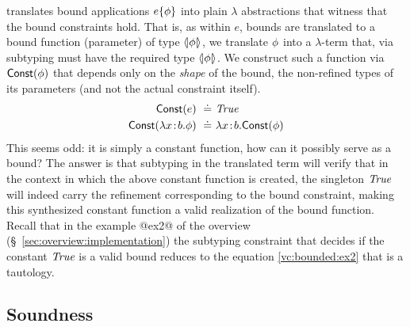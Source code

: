  translates bound applications
$ e \{ \phi \} $ into plain $\lambda$
abstractions that witness that the bound constraints
hold.
%
That is, as within $e$, bounds are translated to a bound
function (parameter) of type $\langle\!| \phi |\!\rangle$, we
translate $\phi$ into a $\lambda$-term that, via
subtyping must have the required type $\langle\!| \phi |\!\rangle$.
%
We construct such a function via $\mathsf{Const}(\phi)$
that depends only on the \emph{shape} of the bound,
\ie the non-refined types of its parameters (and not
the actual constraint itself).
\begin{align*}
\mathsf{Const}(e) \ \doteq\  & \textit{True} \\
\mathsf{Const}(\lambda {x\!:\!b}. \phi) \ \doteq\  &  \lambda {x\!:\!b}. \mathsf{Const}(\phi)
\end{align*}
%
This seems odd: it is simply a constant function, how
can it possibly serve as a bound? The answer is that
subtyping in the translated \corelan term will verify
that in the context in which the above constant function
is created, the singleton $\textit{True}$ will indeed carry
the refinement corresponding to the bound constraint,
making this synthesized constant function a valid
realization of the bound function.
%
Recall that in the example @ex2@ of the overview (\S~\ref{sec:overview:implementation})
the subtyping constraint that decides if the constant $\textit{True}$
is a valid bound reduces to the equation \ref{vc:bounded:ex2}
that is a tautology.

\subsection{Soundness}\label{sec:soundness}

